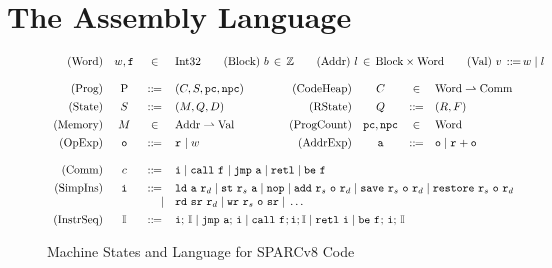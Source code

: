 \section{The \sparc{} Assembly Language}
\label{sec:modeling}

\begin{figure}
	\centering
	\[
		\begin{array}{rcclcrccl}
			\TYPE{(Word)} & \word, \lab{} & \in & 
			\multicolumn{6}{l}
			{ 
				\TYPE{Int32} \qquad
				\TYPE{(Block)} \ \block \, \in \, \Ztype 
				\qquad
				\TYPE{(Addr)} \ \loc \, \in \,  
					\TYPE{Block} \times \TYPE{Word}
				\qquad
				\TYPE{(Val)} \ \val \,
					\define \, \word \sepline \loc
			}
			\\
			\\
			\TYPE{(Prog)} & \prog & \define & 
				(\code, \state, \pc, \npc) & \qquad & 
			\TYPE{(CodeHeap)} & \ \code \ & \in &  
				\TYPE{Word} \rightharpoonup \TYPE{Comm}
			\\
			\\[-8pt]
			\TYPE{(State)} & \state & \define & 
				(\mem, \Rstate, \DBuf) & & 
			\TYPE{(RState)} & \Rstate & \define & 
				(\RFile, \Wstack) 
			\\
			\\[-8pt]
			\TYPE{(Memory)} & \mem & \in & 
				\TYPE{Addr} \rightharpoonup \TYPE{Val} 
			& & 
			\TYPE{(ProgCount)} & \pc, \npc & \in & \TYPE{Word}
			\\
			\\[-8pt]
			\TYPE{(OpExp)} & \oexp & \define & 
				\reg{} \sepline \word & & 
			\TYPE{(AddrExp)} & \aexp & \define & 
				\oexp \sepline \reg{} + \oexp \\
			\\
			\TYPE{(Comm)} & \comm & \define & 
			\multicolumn{6}{l}
			{
				\simplins{} \sepline \call{} \ \lab{}
				\sepline \jmp{} \ \aexp \sepline \retl{} \sepline
				\be \ \lab{} 
			} \\
			\\[-8pt]
			\TYPE{(SimpIns)} & \simplins{} & \define & 
			\multicolumn{6}{l}
			{
				\ld{} \ \aexp \ \reg{d} \sepline 
				\st{} \ \reg{s} \ \aexp \sepline
				\nop{} \sepline  
				\cadd{} \ \reg{s} \ \oexp \ \reg{d} \sepline
				\csave{} \ \reg{s} \ \oexp \ \reg{d} \sepline 
				\crestore{} \ \reg{s} \ \oexp \ \reg{d}
			} \\
			& & \ \ \ \ | & 
			\multicolumn{6}{l}
			{
				\rd{} \ \sr \ \reg{d} \sepline 
				\cwr{} \ \reg{s} \ \oexp \ \sr \sepline
				\dots
			} \\ 
			\\[-8pt]
			\TYPE{(InstrSeq)} & \cblk & \define & 
			\multicolumn{6}{l}
			{
				\simplins{}; \, \cblk \sepline 
				\jmp{} \ \aexp; \, \simplins{} \sepline 
				\call{} \ \lab{}; \simplins{}; \cblk \sepline 
				\retl{} \ \simplins{} \sepline 
				\be{} \ \lab{}; \, \simplins{}; \, \cblk
			}
		\end{array}
	\]
	\caption{Machine States and Language for SPARCv8 Code}
	\label {fig:Machine States and Language for SPARC Code}
\end{figure}
